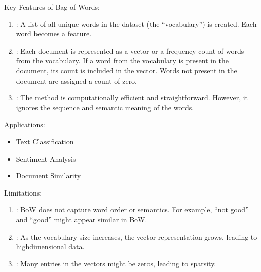 \documentclass[letterpaper,11pt,english]{sphinxmanual}
\begin{document}
\sphinxAtStartPar
Key Features of Bag of Words:
\begin{enumerate}
%
\item {} 
\sphinxAtStartPar
{}:
\sphinxhyphen{} A list of all unique words in the dataset (the “vocabulary”) is created.
\sphinxhyphen{} Each word becomes a feature.

\item {} 
\sphinxAtStartPar
{}:
\sphinxhyphen{} Each document is represented as a vector or a frequency count of words from the vocabulary.
\sphinxhyphen{} If a word from the vocabulary is present in the document, its count is included in the vector.
\sphinxhyphen{} Words not present in the document are assigned a count of zero.

\item {} 
\sphinxAtStartPar
{}:
\sphinxhyphen{} The method is computationally efficient and straightforward.
\sphinxhyphen{} However, it ignores the sequence and semantic meaning of the words.

\end{enumerate}

\sphinxAtStartPar
Applications:
\begin{itemize}
\item {} 
\sphinxAtStartPar
Text Classification

\item {} 
\sphinxAtStartPar
Sentiment Analysis

\item {} 
\sphinxAtStartPar
Document Similarity

\end{itemize}

\sphinxAtStartPar
Limitations:
\begin{enumerate}
%
\item {} 
\sphinxAtStartPar
{}:
\sphinxhyphen{} BoW does not capture word order or semantics.
\sphinxhyphen{} For example, “not good” and “good” might appear similar in BoW.

\item {} 
\sphinxAtStartPar
{}:
\sphinxhyphen{} As the vocabulary size increases, the vector representation grows, leading to high\sphinxhyphen{}dimensional data.

\item {} 
\sphinxAtStartPar
{}:
\sphinxhyphen{} Many entries in the vectors might be zeros, leading to sparsity.

\end{enumerate}
\end{document}
